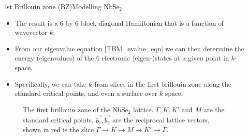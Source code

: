 \documentclass[9pt]{beamer}
\begin{document}
\begin{frame}{1st Brillouin zone (BZ)}{Modelling NbSe$_2$}
  \begin{itemize}
    \item The result is a 6 by 6 block-diagonal Hamiltonian that is a function of wavevector $k$.

    \item From our eigenvalue equation \eqref{TBM_evalue_eqn} we can then determine the energy (eigenvalues) of the 6 electronic (eigen-)states at a given point in $k$-space.

    \item Specifically, we can take $k$ from slices in the first brillouin zone along the standard critical points, and even a surface over $k$ space.
  \end{itemize}

  \begin{figure}
    \centering
    \caption{The first brillouin zone of the NbSe$_2$ lattice. $\Gamma, K, K' \text{ and } M$ are the standard critical points. $\vec{b_1}, \vec{b_2}$ are the reciprocal lattice vectors, shown in red is the slice $\Gamma \rightarrow K \rightarrow M \rightarrow K' \rightarrow \Gamma$.}
  \end{figure}
\end{frame}
\end{document}
